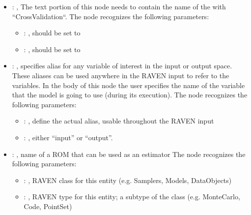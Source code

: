 \begin{itemize}
\begin{itemize}
        \item {}: ,
          List of IDs of features/variables to include in the transformation process.

        \item {}: ,
          Which space to search? Target or Feature?
      \end{itemize}

    \item {}: ,
      The text portion of this node needs to contain the name of the  with
               ``CrossValidation``.
      The  node recognizes the following parameters:
        \begin{itemize}
          \item {}: ,
            should be set to 
          \item {}: ,
            should be set to 
      \end{itemize}

    \item {}: ,
      specifies alias for         any variable of interest in the input or output space. These
      aliases can be used anywhere in the RAVEN input to         refer to the variables. In the body
      of this node the user specifies the name of the variable that the model is going to use
      (during its execution).
      The  node recognizes the following parameters:
        \begin{itemize}
          \item {}: ,
            define the actual alias, usable throughout the RAVEN input
          \item {}: ,
            either ``input'' or ``output''.
      \end{itemize}

    \item {}: ,
      name of a ROM that can be used as an estimator
      The  node recognizes the following parameters:
        \begin{itemize}
          \item {}: ,
            RAVEN class for this entity (e.g. Samplers, Models, DataObjects)
          \item {}: ,
            RAVEN type for this entity; a subtype of the class (e.g. MonteCarlo, Code, PointSet)
      \end{itemize}


\end{itemize}
